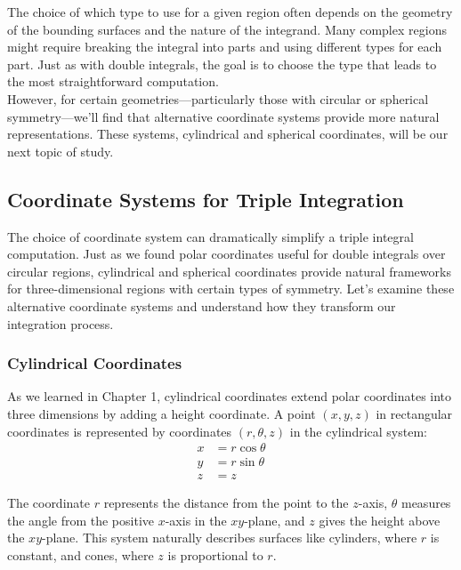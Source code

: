 \noindent The choice of which type to use for a given region often depends on the geometry of the bounding surfaces and the nature of the integrand. Many complex regions might require breaking the integral into parts and using different types for each part. Just as with double integrals, the goal is to choose the type that leads to the most straightforward computation. \\

\noindent However, for certain geometries—particularly those with circular or spherical symmetry—we'll find that alternative coordinate systems provide more natural representations. These systems, cylindrical and spherical coordinates, will be our next topic of study.

\subsection*{Coordinate Systems for Triple Integration}

\noindent The choice of coordinate system can dramatically simplify a triple integral computation. Just as we found polar coordinates useful for double integrals over circular regions, cylindrical and spherical coordinates provide natural frameworks for three-dimensional regions with certain types of symmetry. Let's examine these alternative coordinate systems and understand how they transform our integration process.

\subsubsection*{Cylindrical Coordinates}

\noindent As we learned in Chapter 1, cylindrical coordinates extend polar coordinates into three dimensions by adding a height coordinate. A point $(x,y,z)$ in rectangular coordinates is represented by coordinates $(r,\theta,z)$ in the cylindrical system:
\begin{align*}
x &= r\cos\theta \\
y &= r\sin\theta \\
z &= z
\end{align*}

\noindent The coordinate $r$ represents the distance from the point to the $z$-axis, $\theta$ measures the angle from the positive $x$-axis in the $xy$-plane, and $z$ gives the height above the $xy$-plane. This system naturally describes surfaces like cylinders, where $r$ is constant, and cones, where $z$ is proportional to $r$. \\

